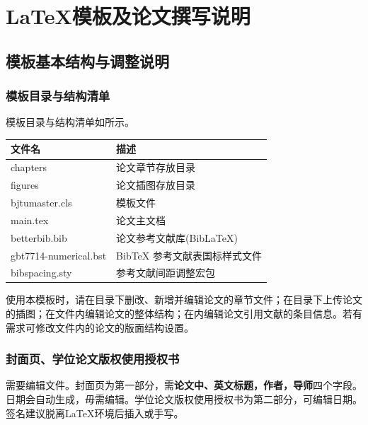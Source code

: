 \chapter{\LaTeX{}模板及论文撰写说明}\label{cha:3}

\section{模板基本结构与调整说明}

\subsection{模板目录与结构清单}
模板目录与结构清单如所示。


\begin{table}[H]\wuhao
  \centering
  \renewcommand\arraystretch{0.8} %
  \begin{tabular}{ll}
    \toprule
    文件名          & 描述                         \\
    \midrule
    chapters & 论文章节存放目录  \\
    figures & 论文插图存放目录        \\
    bjtumaster.cls   & 模板文件                     \\
    main.tex & 论文主文档    \\
    betterbib.bib & 论文参考文献库(BibLaTeX)        \\
    gbt7714-numerical.bst & BibTeX 参考文献表国标样式文件    \\
    bibspacing.sty & 参考文献间距调整宏包  \\
    \bottomrule
  \end{tabular}
  \label{模板目录与结构清单}
\end{table}

使用本模板时，请在目录下删改、新增并编辑论文的章节文件；在目录下上传论文的插图；在文件内编辑论文的整体结构；在内编辑论文引用文献的条目信息。若有需求可修改文件内的论文的版面结构设置。

\subsection{封面页、学位论文版权使用授权书}
需要编辑文件。封面页为第一部分，需\textbf{论文中、英文标题，作者，导师}四个字段。日期会自动生成，毋需编辑。学位论文版权使用授权书为第二部分，可编辑日期。签名建议脱离\LaTeX{}环境后插入或手写。

